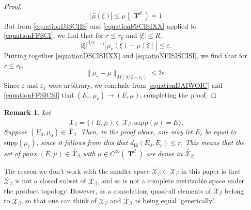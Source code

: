 \documentclass[12pt,reqno]{article}
\numberwithin{equation}{section}
\DeclareMathOperator{\TT}{\mathbf{T}}
\newtheorem{remark}[theorem]{Remark}
\numberwithin{theorem}{section}
\begin{document}
\begin{proof}
    \begin{equation} \label{equationFSCISIXX}
        |\widehat{\mu}(\xi)| \leq \mu(\TT^d) = 1
    \end{equation}
    But from \eqref{equationDISCIIS} and \eqref{equationFSCISIXX} applied to \eqref{equationFFSCI}, we find that for $r \leq r_0$ and $|\xi| \leq R$,
    \begin{equation} \label{equatioNFISISCISI}
        |\xi|^{\beta/2 - \varepsilon_1} |\mu_r(\xi) - \mu(\xi)| \leq \varepsilon.
    \end{equation}
    Putting together \eqref{equationDSCISIIXX} and \eqref{equatioNFISISCISI}, we find that for $r \leq r_0$,
    \begin{equation} \label{equationDAIWOIC}
        \| \mu_r - \mu \|_{M(\beta/2 - \varepsilon_1)} \leq 2\varepsilon.
    \end{equation}
    Since $\varepsilon$ and $\varepsilon_1$ were arbitrary, we conclude from \eqref{equationDAIWOIC} and \eqref{equationFFSICSI} that $(E_r,\mu_r) \to (E,\mu)$, completing the proof.
\end{proof}

\begin{remark} \label{remarkDOIWJDIOWJ2}
    Let
    \[ \tilde{\mathcal{X}_\beta} = \{ (E,\mu) \in \mathcal{X}_\beta : \text{supp}(\mu) = E \}. \]
    Suppose $(E_0,\mu_0) \in \tilde{\mathcal{X}_\beta}$. Then, in the proof above, one may let $E_r$ be equal to $\text{supp}(\mu_r)$, since it follows from this that $d_\mathbf{H}(E_0,E_r) \leq r$. This means that the set of pairs $(E,\mu) \in \tilde{\mathcal{X}_\beta}$ with $\mu \in C^\infty(\TT^d)$ are dense in $\tilde{\mathcal{X}_\beta}$.
\end{remark}

The reason we don't work with the smaller space $\tilde{\mathcal{X}_\beta} \subset \mathcal{X}_\beta$ in this paper is that $\tilde{\mathcal{X}_\beta}$ is not a closed subset of $\mathcal{X}_\beta$, and so is not a complete metrizable space under the product topology. However, as a consolation, quasi-all elements of $\mathcal{X}_\beta$ belong to $\tilde{\mathcal{X}_\beta}$, so that one can think of $\mathcal{X}_\beta$ and $\tilde{\mathcal{X}_\beta}$ as being equal `generically'.
\end{document}
